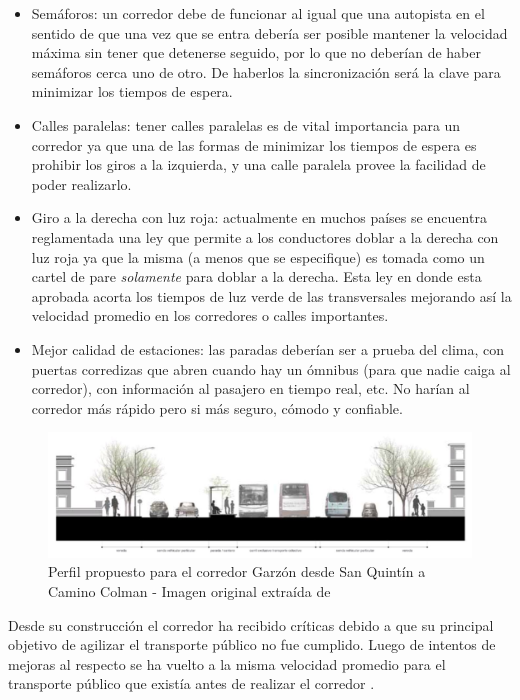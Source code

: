 \begin{itemize}
	\item Semáforos: un corredor debe de funcionar al igual que una autopista en el sentido de que una vez que se entra debería ser posible mantener la velocidad máxima sin tener que detenerse seguido, por lo que no deberían de haber semáforos cerca uno de otro. De haberlos la sincronización será la clave para minimizar los tiempos de espera.
	\item Calles paralelas: tener calles paralelas es de vital importancia para un corredor ya que una de las formas de minimizar los tiempos de espera es prohibir los giros a la izquierda, y una calle paralela provee la facilidad de poder realizarlo.
	\item Giro a la derecha con luz roja: actualmente en muchos países se encuentra reglamentada una ley que permite a los conductores doblar a la derecha con luz roja ya que la misma (a menos que se especifique) es tomada como un cartel de pare \emph{solamente} para doblar a la derecha. Esta ley en donde esta aprobada acorta los tiempos de luz verde de las transversales mejorando así la velocidad promedio en los corredores o calles importantes.
	\item Mejor calidad de estaciones: las paradas deberían ser a prueba del clima, con puertas corredizas que abren cuando hay un ómnibus (para que nadie caiga al corredor), con información al pasajero en tiempo real, etc. No harían al corredor más rápido pero si más seguro, cómodo y confiable.
\end{itemize}


\begin{figure}[H]
	\centering
	\includegraphics[width=0.9\linewidth]{Figures/busway_configuration}
	\caption{Perfil propuesto para el corredor Garzón desde San Quintín a Camino Colman - Imagen original extraída de \citep{PlanMovilidad}
	}
	\label{fig:perfil_garzon}
\end{figure}

Desde su construcción el corredor ha recibido críticas debido a que su principal objetivo de agilizar el transporte público no fue cumplido. Luego de intentos de mejoras al respecto se ha vuelto a la misma velocidad promedio para el transporte público que existía antes de realizar el corredor \citep{olivera2015}.

